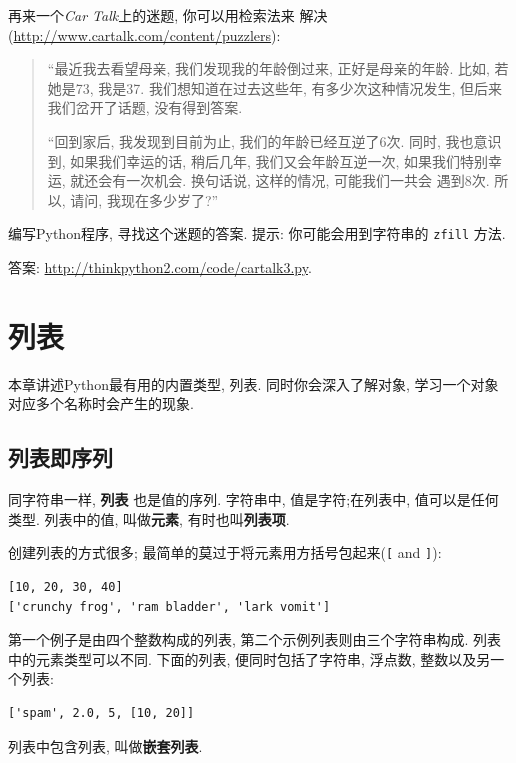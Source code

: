 \documentclass[10pt]{book}
\begin{document}
\begin{exercise}
再来一个{\em Car Talk}上的迷题, 你可以用检索法来
解决(\url{http://www.cartalk.com/content/puzzlers}):

\begin{quote}
``最近我去看望母亲, 我们发现我的年龄倒过来, 正好是母亲的年龄. 
比如, 若她是73, 我是37. 我们想知道在过去这些年, 有多少次这种情况发生, 
但后来我们岔开了话题, 没有得到答案. 

``回到家后, 我发现到目前为止, 我们的年龄已经互逆了6次. 
同时, 我也意识到, 如果我们幸运的话, 稍后几年, 我们又会年龄互逆一次, 
如果我们特别幸运, 就还会有一次机会. 换句话说, 这样的情况, 可能我们一共会
遇到8次. 所以, 请问, 我现在多少岁了?''

\end{quote}

编写Python程序, 寻找这个迷题的答案. 
提示: 你可能会用到字符串的 {\tt zfill} 方法. 

答案: \url{http://thinkpython2.com/code/cartalk3.py}.

\end{exercise}



\chapter{列表}

本章讲述Python最有用的内置类型, 列表. 
同时你会深入了解对象, 学习一个对象对应多个名称时会产生的现象. 


\section{列表即序列}
\label{sequence}

同字符串一样, {\bf 列表} 也是值的序列. 
字符串中, 值是字符;在列表中, 值可以是任何类型. 
列表中的值, 叫做{\bf 元素}, 有时也叫{\bf 列表项}.

创建列表的方式很多; 最简单的莫过于将元素用方括号包起来(\verb"[" and \verb"]"):

\begin{verbatim}
[10, 20, 30, 40]
['crunchy frog', 'ram bladder', 'lark vomit']
\end{verbatim}
%
第一个例子是由四个整数构成的列表, 
第二个示例列表则由三个字符串构成. 
列表中的元素类型可以不同. 
下面的列表, 便同时包括了字符串, 浮点数, 整数以及另一个列表:

\begin{verbatim}
['spam', 2.0, 5, [10, 20]]
\end{verbatim}
%
列表中包含列表, 叫做{\bf 嵌套列表}.
\end{document}

